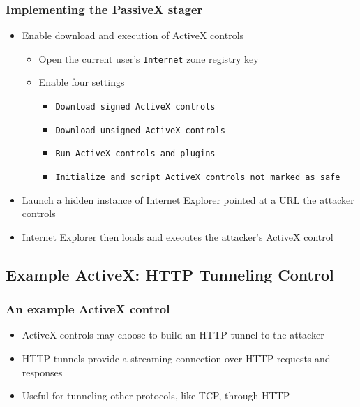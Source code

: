 \documentclass{beamer}
\newenvironment{sitemize}{\vspace{1mm}\begin{itemize}\itemsep 4pt\small}{\end{itemize}}
\begin{document}
\begin{frame}[t]
    \frametitle{Implementing the PassiveX stager}

    \begin{sitemize}
        \item Enable download and execution of ActiveX controls
        \begin{sitemize}
            \item Open the current user's \texttt{Internet} zone
            registry key
            \item Enable four settings
            \begin{sitemize}
                \item \texttt{Download signed ActiveX controls}
                \item \texttt{Download unsigned ActiveX controls}
                \item \texttt{Run ActiveX controls and plugins}
                \item \texttt{Initialize and script ActiveX controls not
            marked as safe}
            \end{sitemize}
        \end{sitemize}

        \pause
        \item Launch a hidden instance of Internet Explorer pointed
        at a URL the attacker controls

        \pause
        \item Internet Explorer then loads and executes the attacker's
        ActiveX control
    \end{sitemize}
\end{frame}

\subsection{Example ActiveX: HTTP Tunneling Control}
\begin{frame}[t]
    \frametitle{An example ActiveX control}

    \begin{sitemize}
        \item ActiveX controls may choose to build an HTTP tunnel
        to the attacker
        \item HTTP tunnels provide a streaming connection over HTTP
        requests and responses
        \item Useful for tunneling other protocols, like TCP,
        through HTTP

    \end{sitemize}
\end{frame}
\end{document}
